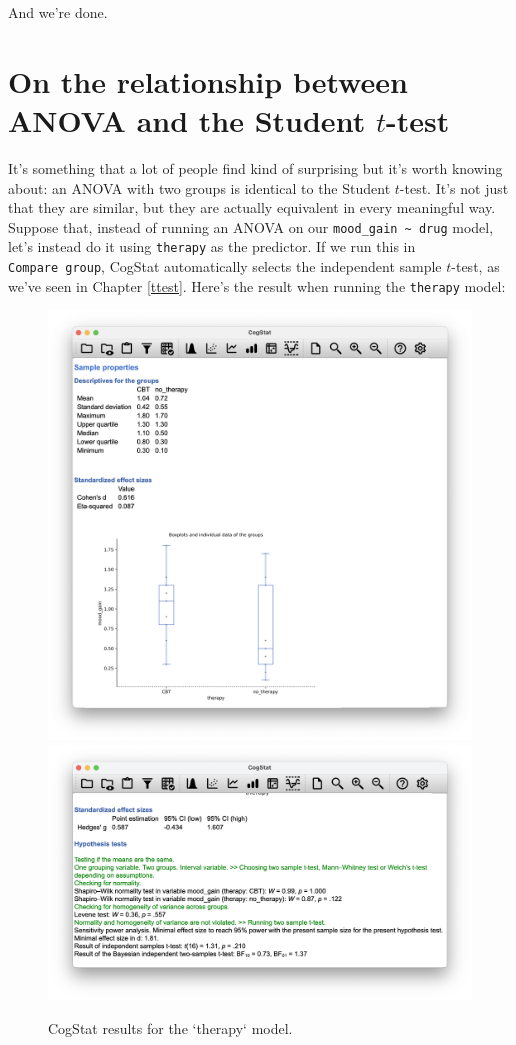 \documentclass[
  11pt,
  a4paper,
  twoside,symmetric,openright]{book}
\theoremstyle{break}
\theoremstyle{break}
\begin{document}
And we're done.

\section{\texorpdfstring{On the relationship between ANOVA and the Student \(t\)-test}{On the relationship between ANOVA and the Student t-test}}\label{anovaandt}

It's something that a lot of people find kind of surprising but it's worth knowing about: an ANOVA with two groups is identical to the Student \(t\)-test. It's not just that they are similar, but they are actually equivalent in every meaningful way. Suppose that, instead of running an ANOVA on our \texttt{mood\_gain\ \textasciitilde{}\ drug} model, let's instead do it using \texttt{therapy} as the predictor. If we run this in \texttt{Compare\ group}, CogStat automatically selects the independent sample \(t\)-test, as we've seen in Chapter \ref{ttest}. Here's the result when running the \texttt{therapy} model:

\begin{figure}

{\centering \includegraphics[width=0.6\linewidth]{resources/image/csmoodgaintherapybox} \includegraphics[width=0.6\linewidth]{resources/image/csmoodgaintherapyresult} 

}

\caption{CogStat results for the `therapy` model.}\label{fig:ttesttherapy}
\end{figure}
\end{document}
